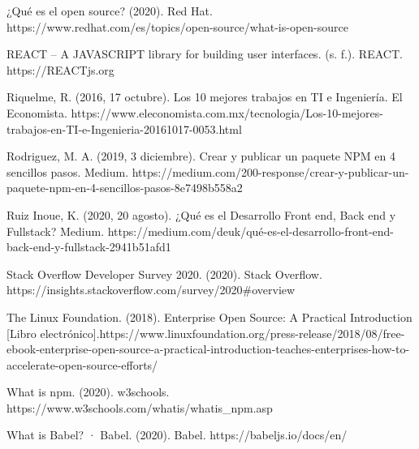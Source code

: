 \begin{thebibliography}{100}
\bibitem{} ¿Qué es el open source? (2020). Red Hat. https://www.redhat.com/es/topics/open-source/what-is-open-source

 REACT – A JAVASCRIPT library for building user interfaces. (s. f.). REACT. https://REACTjs.org

 Riquelme, R. (2016, 17 octubre). Los 10 mejores trabajos en TI e Ingeniería. El Economista. https://www.eleconomista.com.mx/tecnologia/Los-10-mejores-trabajos-en-TI-e-Ingenieria-20161017-0053.html

 Rodriguez, M. A. (2019, 3 diciembre). Crear y publicar un paquete NPM en 4 sencillos pasos. Medium. https://medium.com/200-response/crear-y-publicar-un-paquete-npm-en-4-sencillos-pasos-8e7498b558a2

 Ruiz Inoue, K. (2020, 20 agosto). ¿Qué es el Desarrollo Front end, Back end y Fullstack? Medium. https://medium.com/deuk/qué-es-el-desarrollo-front-end-back-end-y-fullstack-2941b51afd1

 Stack Overflow Developer Survey 2020. (2020). Stack Overflow. https://insights.stackoverflow.com/survey/2020#overview

 The Linux Foundation. (2018). Enterprise Open Source: A Practical Introduction [Libro electrónico].https://www.linuxfoundation.org/press-release/2018/08/free-ebook-enterprise-open-source-a-practical-introduction-teaches-enterprises-how-to-accelerate-open-source-efforts/

 What is npm. (2020). w3schools. https://www.w3schools.com/whatis/whatis_npm.asp

 What is Babel? · Babel. (2020). Babel. https://babeljs.io/docs/en/



\end{thebibliography}